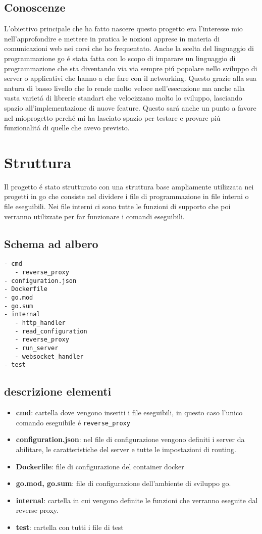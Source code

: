 \subsection{Conoscenze}
L'obiettivo principale che ha fatto nascere questo progetto era l'interesse mio nell'approfondire e mettere in pratica le nozioni apprese in materia di comunicazioni web nei corsi che ho frequentato. Anche la scelta del linguaggio di programmazione go é stata fatta con lo scopo di imparare un linguaggio di programmazione che sta diventando via via sempre piú popolare nello sviluppo di server o applicativi che hanno a che fare con il networking. Questo grazie alla sua natura di basso livello che lo rende molto veloce nell'esecuzione ma anche alla vasta varietá di librerie standart che velocizzano molto lo sviluppo, lasciando spazio all'implementazione di nuove feature. Questo sará anche un punto a favore nel mioprogetto perché mi ha lasciato spazio per testare e provare piú funzionalitá di quelle che avevo previsto.

\section{Struttura}
Il progetto é stato strutturato con una struttura base ampliamente utilizzata nei progetti in go che consiste nel dividere i file di programmazione in file interni o file eseguibili. Nei file interni ci sono tutte le funzioni di supporto che poi verranno utilizzate per far funzionare i comandi eseguibili.
\subsection{Schema ad albero}
\begin{verbatim}
- cmd
   - reverse_proxy
- configuration.json
- Dockerfile
- go.mod
- go.sum
- internal
   - http_handler
   - read_configuration
   - reverse_proxy
   - run_server
   - websocket_handler
- test
\end{verbatim}
\subsection{descrizione elementi}
\begin{itemize}[label={}]
  \item \textbf{cmd}: cartella dove vengono inseriti i file eseguibili, in questo caso l'unico comando eseguibile é \texttt{reverse\_proxy}
  \item \textbf{configuration.json}: nel file di configurazione vengono definiti i server da abilitare, le caratteristiche del server e tutte le impostazioni di routing.
  \item \textbf{Dockerfile}: file di configurazione del container docker
  \item \textbf{go.mod, go.sum}: file di configurazione dell'ambiente di sviluppo go.
  \item \textbf{internal}: cartella in cui vengono definite le funzioni che verranno eseguite dal reverse proxy.
  \item \textbf{test}: cartella con tutti i file di test
\end{itemize}

